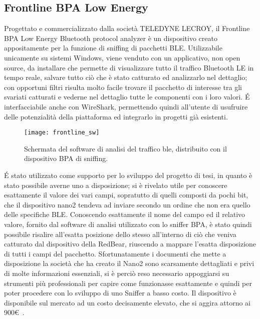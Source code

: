 \subsection{Frontline BPA Low Energy}
Progettato e commercializzato dalla società TELEDYNE LECROY, il Frontline BPA Low Energy Bluetooth protocol analyzer è un dispositivo creato appositamente per la funzione di sniffing di pacchetti BLE. Utilizzabile unicamente su sistemi Windows, viene venduto con un applicativo, non open source, da installare che permette di visualizzare tutto il traffico Bluetooth LE in tempo reale, salvare tutto ciò che è stato catturato ed analizzarlo nel dettaglio; con opportuni filtri risulta molto facile trovare il pacchetto di interesse tra gli svariati catturati e vederne nel dettaglio tutte le componenti con i loro valori. \'E interfacciabile anche con WireShark, permettendo quindi all'utente di usufruire delle potenzialità della piattaforma ed integrarlo in progetti già esistenti.

\begin{figure}[H]
\texttt{[image: frontline\_sw]}
\centering
\caption{Schermata del software di analisi del traffico ble, distribuito con il dispositivo BPA di sniffing. }
\end{figure}

\'E stato utilizzato come supporto per lo sviluppo del progetto di tesi, in quanto è stato possibile averne uno a disposizione; si è rivelato utile per conoscere esattamente il valore dei vari campi, sopratutto di quelli composti da pochi bit, che il dispositivo nano2 tendeva ad inviare secondo un ordine che non era quello delle specifiche BLE. Conoscendo esattamente il nome del campo ed il relativo valore, fornito dal software di analisi utilizzato con lo sniffer BPA, è stato quindi possibile risalire all'esatta posizione dello stesso all'interno di ciò che veniva catturato dal dispositivo della RedBear, riuscendo a mappare l'esatta disposizione di tutti i campi del pacchetto. Sfortunatamente i documenti che mette a disposizione la società che ha creato il Nano2 sono scarsamente dettagliati e privi di molte informazioni essenziali, si è perciò reso necessario appoggiarsi su strumenti più professionali per capire come funzionasse esattamente e quindi per poter procedere con lo sviluppo di uno Sniffer a basso costo.
Il dispositivo è disponibile sul mercato ad un costo decisamente elevato, che si aggira attorno ai 900\euro\ .
